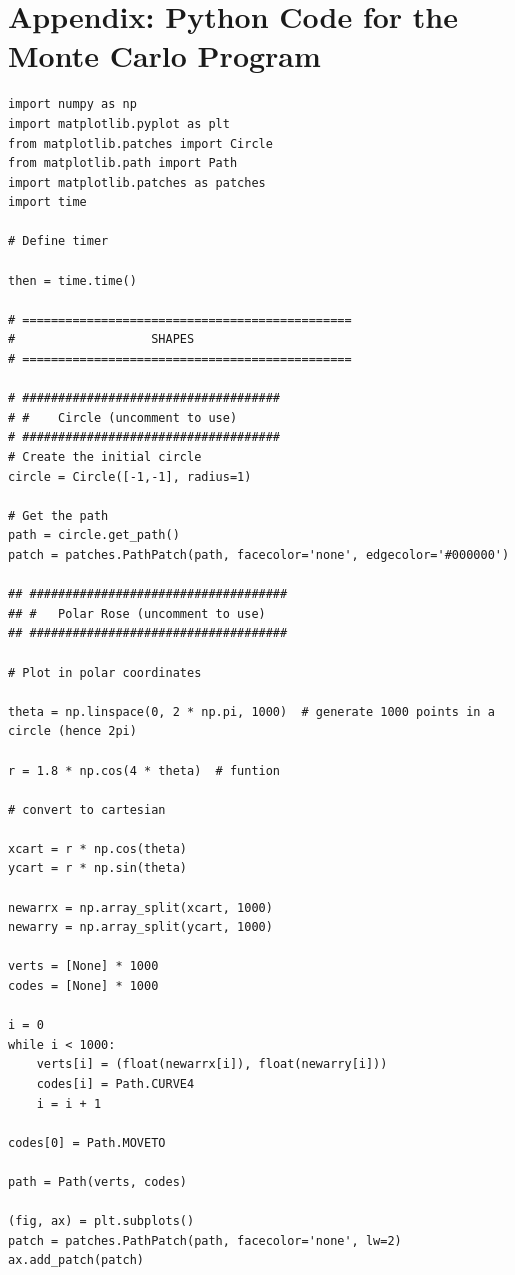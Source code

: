 \documentclass[11pt]{article}
\begin{document}
\newpage

\appendix


\section{Appendix: Python Code for the Monte Carlo Program}



\begin{singlespace}
\begin{lstlisting}
import numpy as np
import matplotlib.pyplot as plt
from matplotlib.patches import Circle
from matplotlib.path import Path
import matplotlib.patches as patches
import time

# Define timer

then = time.time()

# ==============================================
#                   SHAPES
# ==============================================

# ####################################
# #    Circle (uncomment to use)
# ####################################
# Create the initial circle
circle = Circle([-1,-1], radius=1)

# Get the path
path = circle.get_path()
patch = patches.PathPatch(path, facecolor='none', edgecolor='#000000')

## ####################################
## #   Polar Rose (uncomment to use)
## ####################################

# Plot in polar coordinates

theta = np.linspace(0, 2 * np.pi, 1000)  # generate 1000 points in a circle (hence 2pi)

r = 1.8 * np.cos(4 * theta)  # funtion

# convert to cartesian

xcart = r * np.cos(theta)
ycart = r * np.sin(theta)

newarrx = np.array_split(xcart, 1000)
newarry = np.array_split(ycart, 1000)

verts = [None] * 1000
codes = [None] * 1000

i = 0
while i < 1000:
    verts[i] = (float(newarrx[i]), float(newarry[i]))
    codes[i] = Path.CURVE4
    i = i + 1

codes[0] = Path.MOVETO

path = Path(verts, codes)

(fig, ax) = plt.subplots()
patch = patches.PathPatch(path, facecolor='none', lw=2)
ax.add_patch(patch)


\end{lstlisting}
\end{singlespace}
\end{document}
